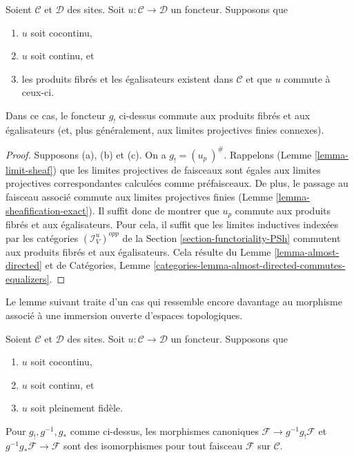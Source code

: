 \begin{lemma}
\label{lemma-preserve-equalizers}
Soient $\mathcal{C}$ et $\mathcal{D}$ des sites.
Soit $u : \mathcal{C} \to \mathcal{D}$ un foncteur.
Supposons que
\begin{enumerate}
\item[(a)] $u$ soit cocontinu,
\item[(b)] $u$ soit continu, et
\item[(c)] les produits fibrés et les égalisateurs existent dans
$\mathcal{C}$ et que $u$ commute à ceux-ci.
\end{enumerate}
Dans ce cas, le foncteur $g_!$ ci-dessus commute aux produits fibrés et aux
égalisateurs (et, plus généralement, aux limites projectives finies connexes).
\end{lemma}

\begin{proof}
Supposons (a), (b) et (c).
On a $g_! = (u_p\ )^\#$. Rappelons (Lemme \ref{lemma-limit-sheaf}) que les
limites projectives de faisceaux sont égales aux limites projectives
correspondantes calculées comme préfaisceaux. De plus, le passage au faisceau
associé commute aux limites projectives finies
(Lemme \ref{lemma-sheafification-exact}). Il suffit donc de montrer que $u_p$
commute aux produits fibrés et aux égalisateurs. Pour cela, il suffit que les
limites inductives indexées par les catégories
$(\mathcal{I}_V^u)^{opp}$ de la
Section \ref{section-functoriality-PSh}
commutent aux produits fibrés et aux égalisateurs. Cela résulte du
Lemme \ref{lemma-almost-directed} et de Catégories,
Lemme \ref{categories-lemma-almost-directed-commutes-equalizers}.
\end{proof}

\noindent
Le lemme suivant traite d’un cas qui ressemble encore davantage au morphisme
associé à une immersion ouverte d’espaces topologiques.

\begin{lemma}
\label{lemma-back-and-forth}
Soient $\mathcal{C}$ et $\mathcal{D}$ des sites.
Soit $u : \mathcal{C} \to \mathcal{D}$ un foncteur.
Supposons que
\begin{enumerate}
\item[(a)] $u$ soit cocontinu,
\item[(b)] $u$ soit continu, et
\item[(c)] $u$ soit pleinement fidèle.
\end{enumerate}
Pour $g_!, g^{-1}, g_*$ comme ci-dessus, les morphismes canoniques
$\mathcal{F} \to g^{-1}g_!\mathcal{F}$ et
$g^{-1}g_*\mathcal{F} \to \mathcal{F}$ sont des isomorphismes pour tout
faisceau $\mathcal{F}$ sur $\mathcal{C}$.
\end{lemma}

